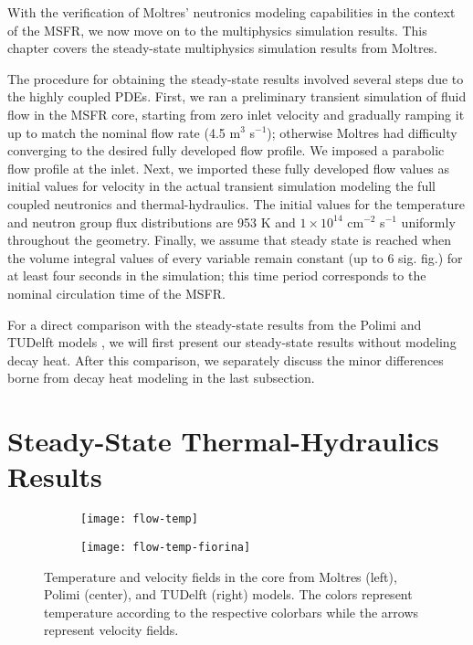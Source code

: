With the verification of Moltres' neutronics modeling capabilities in the
context of the \gls{MSFR}, we now move on to the multiphysics simulation
results. This chapter covers the steady-state multiphysics simulation results
from Moltres.

The procedure for obtaining the steady-state results involved several steps
due to the highly coupled \glspl{PDE}. First, we ran a preliminary transient
simulation of fluid flow in the \gls{MSFR} core, starting from zero inlet
velocity and gradually ramping it up to match the nominal flow rate (4.5 m$^3$
s$^{-1}$); otherwise Moltres had difficulty converging to the desired fully
developed flow profile. We imposed a parabolic flow profile at the inlet.
Next, we imported these fully developed flow values as initial values for
velocity in the actual transient simulation modeling the full coupled
neutronics and thermal-hydraulics. The initial values for the temperature and
neutron group flux distributions are 953 K and $1 \times 10^{14}$ cm$^{-2}$
s$^{-1}$ uniformly throughout the geometry. Finally, we assume that steady
state is reached when the volume integral values of every variable remain
constant (up to 6 sig. fig.) for at least four seconds in the simulation; this
time period corresponds to the nominal circulation time of the \gls{MSFR}.

For a direct comparison with the steady-state results from the Polimi and
TUDelft models \cite{aufiero_development_2014}, we will first present our
steady-state results without modeling decay heat. After this comparison, we
separately discuss the minor differences borne from decay heat modeling in the
last subsection.

\section{Steady-State Thermal-Hydraulics Results}

\begin{figure}[t!]
    \centering
    \begin{subfigure}[t]{.365\textwidth}
        \centering
        \texttt{[image: flow-temp]}
    \end{subfigure}
    \hfill
    \begin{subfigure}[t]{.625\textwidth}
        \centering
        \texttt{[image: flow-temp-fiorina]}
    \end{subfigure}
    \caption{Temperature and velocity fields in the core from Moltres
    (left), Polimi (center), and TUDelft (right) models. The colors represent
    temperature according to the respective colorbars while the arrows
    represent velocity fields.}
    \label{fig:flow-temp}
\end{figure}


